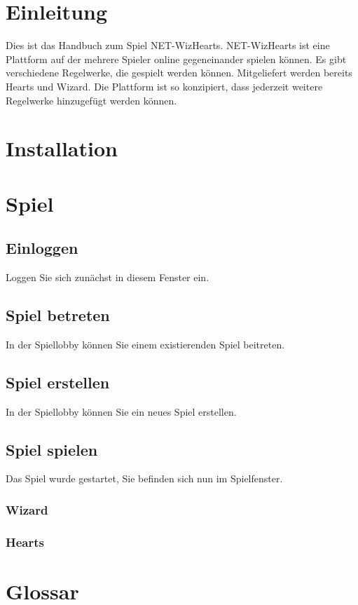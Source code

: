 \documentclass[titlepage,10pt,a4paper]{article}
\begin{document}
\newpage
 
\section{Einleitung}
Dies ist das Handbuch zum Spiel NET-WizHearts. NET-WizHearts ist eine Plattform auf der mehrere Spieler online gegeneinander spielen können. Es gibt verschiedene Regelwerke, die gespielt werden können. Mitgeliefert werden bereits Hearts und Wizard. Die Plattform ist so konzipiert, dass jederzeit weitere Regelwerke hinzugefügt werden können.

\section{Installation}

\section{Spiel}
\subsection{Einloggen}
Loggen Sie sich zunächst in diesem Fenster ein.
\subsection{Spiel betreten}
In der Spiellobby können Sie einem existierenden Spiel beitreten.
\subsection{Spiel erstellen}
In der Spiellobby können Sie ein neues Spiel erstellen.
\subsection{Spiel spielen}
Das Spiel wurde gestartet, Sie befinden sich nun im Spielfenster.
\subsubsection{Wizard}
\subsubsection{Hearts}

 
\section{Glossar}
\end{document}
